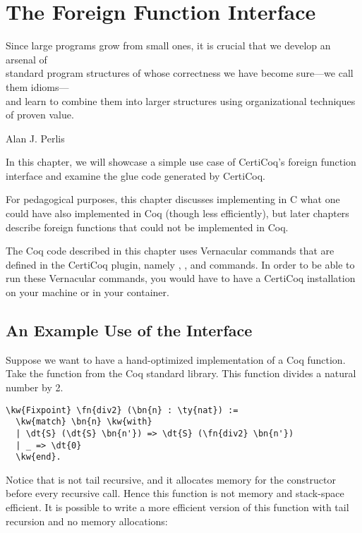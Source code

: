 \chapter{The Foreign Function Interface}
\label{usage}

\epigraph{Since large programs grow from small ones, it is crucial that we develop an arsenal of\\ standard program structures of whose correctness we have become sure—we call them idioms—\\and learn to combine them into larger structures using organizational techniques of proven value.}{Alan J. Perlis~\cite{abelson1996structure}}


In this chapter, we will showcase a simple use case of CertiCoq's foreign function interface and examine the glue code generated by CertiCoq.

For pedagogical purposes, this chapter discusses implementing in C what one could have also implemented in Coq (though less efficiently), but later chapters describe foreign functions that could not be implemented in Coq.

The Coq code described in this chapter uses \gls{Vernacular} commands that are defined in the CertiCoq plugin, namely , , and  commands. In order to be able to run these \gls{Vernacular} commands, you would have to have a CertiCoq installation on your machine or in your container.

\section{An Example Use of the Interface}
Suppose we want to have a hand-optimized implementation of a Coq function. Take the  function from the Coq standard library. This function divides a natural number by 2.

\begin{Verbatim}
\kw{Fixpoint} \fn{div2} (\bn{n} : \ty{nat}) :=
  \kw{match} \bn{n} \kw{with}
  | \dt{S} (\dt{S} \bn{n'}) => \dt{S} (\fn{div2} \bn{n'})
  | _ => \dt{0}
  \kw{end}.
\end{Verbatim}

Notice that  is not tail recursive, and it allocates memory for the constructor  before every recursive call. Hence this function is not memory and stack-space efficient. It is possible to write a more efficient version of this function with tail recursion and no memory allocations:

